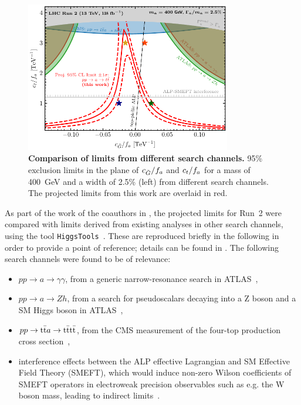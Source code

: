 \begin{figure}[t]
    \centering
    \includegraphics[width=0.8\textwidth]{figures/alps/sum400.pdf}
    \caption{
        \textbf{Comparison of limits from different search channels.} 95\% exclusion limits in the plane of $c_{\tilde{G}}/f_a$ and $c_t/f_a$ for a mass of \SI{400}{\GeV} and a width of 2.5\% (left) from different search channels. The projected limits from this work are overlaid in red.
    }
    \label{fig:alps:summary}
\end{figure}

As part of the work of the coauthors in , the projected limits for Run~2 were compared with limits derived from existing analyses in other search channels, using the tool \texttt{HiggsTools}~\cite{Bahl:2022igd}. These are reproduced briefly in the following in order to provide a point of reference; details can be found in . The following search channels were found to be of relevance:

\begin{itemize}
    \item $p p \rightarrow a \rightarrow \gamma \gamma$, from a generic narrow-resonance search in ATLAS~\cite{ATLAS:2021uiz},

    \item $p p \rightarrow a \rightarrow Z h$, from a search for pseudoscalars decaying into a Z boson and a SM Higgs boson in ATLAS~\cite{ATLAS:2022enb},

    \item $p p \rightarrow \mathrm{t \bar{t}} a \rightarrow \mathrm{t \bar{t}} \mathrm{t \bar{t}}$, from the CMS measurement of the four-top production cross section~\cite{CMS:2023ftu},

    \item interference effects between the ALP effective Lagrangian and SM Effective Field Theory (SMEFT), which would induce non-zero Wilson coefficients of SMEFT operators in electroweak precision observables such as e.g. the W boson mass, leading to indirect limits~\cite{Biekotter:2023mpd}.
\end{itemize}

